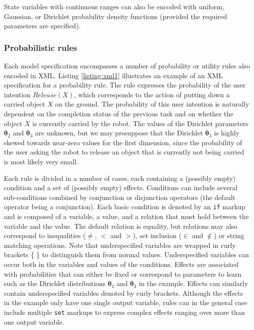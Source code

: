 State variables with continuous ranges can also be encoded with uniform, Gaussian, or Dirichlet probability density functions (provided the required parameters are specified). 

\subsubsection*{Probabilistic rules}

Each model specification encompasses a number of probability or utility rules also encoded in XML. Listing \ref{listing:xml1} illustrates an example of an XML specification for a probability rule. The rule expresses the probability of the user intention $\mathit{Release}(X)$, which corresponds to the action of putting down a carried object $X$ on the ground.  The probability of this user intention is naturally dependent on the completion status of the previous task and on whether the object $X$ is currently carried by the robot. The values of the Dirichlet parameters $\boldsymbol\theta_2$ and $\boldsymbol\theta_3$ are unknown, but we may presuppose that the Dirichlet $\boldsymbol\theta_3$ is highly skewed towards near-zero values for the first dimension, since the probability of the user asking the robot to release an object that is currently not being carried is most likely very small. 

Each rule is divided in a number of cases, each containing a (possibly empty) condition and a set of (possibly empty) effects.  Conditions can include several sub-conditions combined by conjunction or disjunction operators (the default operator being a conjunction). Each basic condition is denoted by an \texttt{if} markup and is composed of a variable, a value, and a  relation that must hold between the variable and the value. The default relation is equality, but relations may also correspond to inequalities ($\neq$, $<$ and $>$), set inclusion ($\in$ and $\notin$) or string matching operations.  Note that underspecified variables are wrapped in curly brackets \{ \} to distinguish them from normal values. Underspecified variables can occur both in the variables and values of the conditions. Effects are associated with probabilities that can either be fixed or correspond to parameters to learn such as the Dirichlet distributions $\boldsymbol\theta_2$ and $\boldsymbol\theta_3$ in the example. Effects can similarly contain underspecified variables denoted by curly brackets.  Although the effects in the example only have one single output variable, rules can in the general case include multiple \texttt{set} markups to express complex effects ranging over more than one output variable. 

